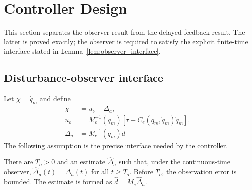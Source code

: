 \section{Controller Design}\label{sec:controller}

This section separates the observer result from the delayed-feedback result. The
latter is proved exactly; the observer is required to satisfy the explicit
finite-time interface stated in Lemma~\ref{lem:observer_interface}.

\subsection{Disturbance-observer interface}\label{sec:ptdo}
Let $\chi=\dot q_m$ and define
\begin{equation}
\begin{aligned}
 \dot\chi&=u_o+\Delta_a,\\
 u_o&=M_e^{-1}(q_m)[\tau-C_e(q_m,\dot q_m)\dot q_m],\\
 \Delta_a&=M_e^{-1}(q_m)d.
\end{aligned}
 \label{eq:observer_channel}
\end{equation}
The following assumption is the precise interface needed by the controller.
\begin{assumption}\label{as:observer_interface}
There are $T_o>0$ and an estimate $\hat\Delta_a$ such that, under the
continuous-time observer, $\hat\Delta_a(t)=\Delta_a(t)$ for all $t\geq T_o$.
Before $T_o$, the observation error is bounded. The estimate is formed as
$\hat d=M_e\hat\Delta_a$.
\end{assumption}

